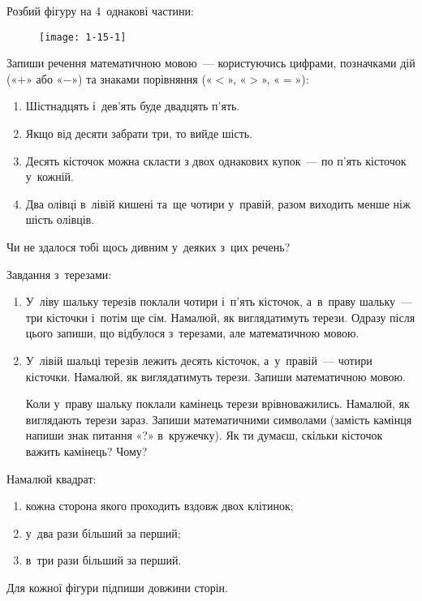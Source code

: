 \problem
Розбий фігуру на 4~однакові частини:

\begin{figure}[h]
    \centering
    \texttt{[image: 1-15-1]}
\end{figure}


\problem
Запиши речення математичною мовою~--- користуючись цифрами,
позначками дій («$+$» або «$-$») та знаками порівняння («$<$», «$>$», «$=$»):
\begin{enumerate}
    \item Шістнадцять і~дев'ять буде двадцять п'ять.
    \item Якщо від десяти забрати три, то вийде шість.
    \item Десять кісточок можна скласти з двох однакових купок~---
    по п'ять кісточок у~кожній.
    \item Два олівці в~лівій кишені та~ще чотири у~правій,
    разом виходить менше ніж шість олівців.
\end{enumerate}
Чи не здалося тобі щось дивним у~деяких з~цих речень?

\problem
Завдання з~терезами:
\begin{enumerate}
    \item У~ліву шальку терезів поклали чотири і~п'ять кісточок,
    а~в~праву шальку~--- три кісточки і~потім ще сім.
    Намалюй, як виглядатимуть терези.
    Одразу після цього запиши, що відбулося з~терезами,
    але математичною мовою.
    \item У~лівій шальці терезів лежить десять кісточок,
    а~у~правій~--- чотири кісточки.
    Намалюй, як виглядатимуть терези. Запиши математичною мовою.

    Коли у~праву шальку поклали камінець терези врівноважились.
    Намалюй, як виглядають терези зараз.
    Запиши математичними символами
    (замість камінця напиши знак питання «?» в~кружечку).
    Як ти думаєш, скільки кісточок важить камінець? Чому?
\end{enumerate}


\problem
Намалюй квадрат:
\begin{enumerate}
    \item кожна сторона якого проходить вздовж двох клітинок;
    \item у~два рази більший за перший;
    \item в~три рази більший за перший.
\end{enumerate}
Для кожної фігури підпиши довжини сторін.


